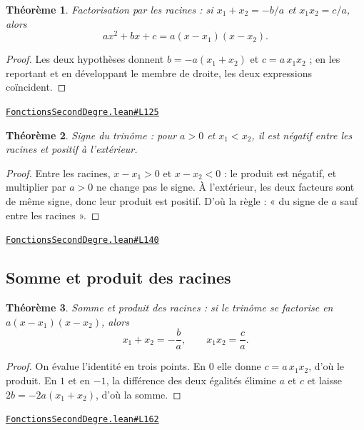 \documentclass[11pt,a4paper]{article}
\theoremstyle{definition}
\theoremstyle{plain}
\newtheorem{theoreme}{Théorème}
\newcommand{\source}[2]{\par\smallskip\noindent\hfill{\footnotesize\href{#1}{\texttt{#2}}}\par\smallskip}
\begin{document}
\begin{theoreme}
Factorisation par les racines : si $x_1 + x_2 = -b/a$ et $x_1x_2 = c/a$, alors
\[ ax^2 + bx + c = a(x - x_1)(x - x_2) . \]
\end{theoreme}

\begin{proof}
Les deux hypothèses donnent $b = -a(x_1 + x_2)$ et $c = a\,x_1x_2$ ; en les reportant et
en développant le membre de droite, les deux expressions coïncident.
\end{proof}
\source{https://github.com/Commutator-IO/learn-lean/blob/main/cours/02-lycee/02-fonctions-second-degre/FonctionsSecondDegre.lean\#L125}{FonctionsSecondDegre.lean\#L125}

\begin{theoreme}
Signe du trinôme : pour $a > 0$ et $x_1 < x_2$, il est négatif entre les racines et
positif à l'extérieur.
\end{theoreme}

\begin{proof}
Entre les racines, $x - x_1 > 0$ et $x - x_2 < 0$ : le produit est négatif, et
multiplier par $a > 0$ ne change pas le signe. À l'extérieur, les deux facteurs sont de
même signe, donc leur produit est positif. D'où la règle : « du signe de $a$ sauf entre les
racines ».
\end{proof}
\source{https://github.com/Commutator-IO/learn-lean/blob/main/cours/02-lycee/02-fonctions-second-degre/FonctionsSecondDegre.lean\#L140}{FonctionsSecondDegre.lean\#L140}

\subsection{Somme et produit des racines}

\begin{theoreme}
Somme et produit des racines : si le trinôme se factorise en $a(x-x_1)(x-x_2)$, alors
\[ x_1 + x_2 = -\frac{b}{a}, \qquad x_1 x_2 = \frac{c}{a} . \]
\end{theoreme}

\begin{proof}
On évalue l'identité en trois points. En $0$ elle donne $c = a\,x_1x_2$, d'où le
produit. En $1$ et en $-1$, la différence des deux égalités élimine $a$ et $c$ et laisse
$2b = -2a(x_1 + x_2)$, d'où la somme.
\end{proof}
\source{https://github.com/Commutator-IO/learn-lean/blob/main/cours/02-lycee/02-fonctions-second-degre/FonctionsSecondDegre.lean\#L162}{FonctionsSecondDegre.lean\#L162}
\end{document}
